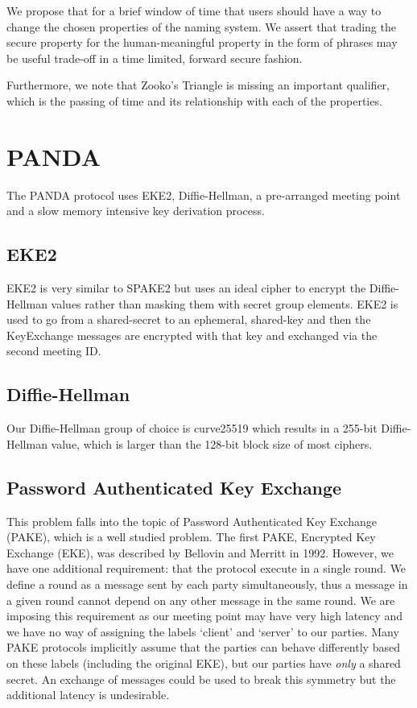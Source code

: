 \documentclass[letterpaper,twocolumn,10pt]{article}
\begin{document}
We propose that for a brief window of time that users should have a way to
change the chosen properties of the naming system.  We assert that trading the
secure property for the human-meaningful property in the form of phrases may be
useful trade-off in a time limited, forward secure fashion.

Furthermore, we note that Zooko's Triangle is missing an important qualifier,
which is the passing of time and its relationship with each of the properties.

\section{PANDA}

The PANDA protocol uses EKE2, Diffie-Hellman, a pre-arranged meeting point and
a slow memory intensive key derivation process.

\subsection{EKE2}

EKE2 is very similar to SPAKE2 but uses an ideal cipher to encrypt the
Diffie-Hellman values rather than masking them with secret group elements. EKE2
is used to go from a shared-secret to an ephemeral, shared-key and then the
KeyExchange messages are encrypted with that key and exchanged via the second
meeting ID.

\subsection{Diffie-Hellman}

Our Diffie-Hellman group of choice is curve25519\cite{bernstein2006curve25519}
which results in a 255-bit Diffie-Hellman value, which is larger than the
128-bit block size of most ciphers.

\subsection{Password Authenticated Key Exchange}

This problem falls into the topic of Password Authenticated Key Exchange
(PAKE), which is a well studied problem. The first PAKE, Encrypted Key Exchange
(EKE), was described by Bellovin and Merritt\cite{bellovin1992encrypted} in
1992. However, we have one additional requirement: that the protocol execute in
a single round. We define a round as a message sent by each party
simultaneously, thus a message in a given round cannot depend on any other
message in the same round.  We are imposing this requirement as our meeting
point may have very high latency and we have no way of assigning the labels
`client' and `server' to our parties.  Many PAKE protocols implicitly assume
that the parties can behave differently based on these labels (including the
original EKE), but our parties have {\it only} a shared secret. An exchange of
messages could be used to break this symmetry but the additional latency is
undesirable.
\end{document}
